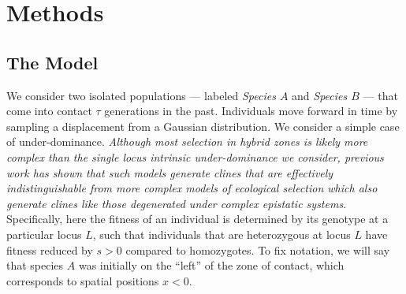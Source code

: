 \documentclass[12pt]{article}
\newcommand{\yb}[1]{{\em \color{magenta} #1}}
\begin{document}



	
\section{Methods}
\subsection*{The Model}
We consider two isolated populations --- labeled \emph{Species $A$} and \emph{Species $B$} ---  that come into contact $\tau$ generations in the past. 
Individuals move forward in time by sampling a displacement from a Gaussian distribution. 
We consider a simple case of under-dominance. 
\yb{Although most selection in hybrid zones is likely more complex than the single locus intrinsic under-dominance we consider, previous work has shown that such models generate clines that are effectively indistinguishable from more complex models of ecological selection \citep{Barton1989, Barton1993} which also generate clines like those degenerated under complex epistatic systems}. Specifically, here the fitness of an individual is  determined by its genotype at a particular locus $L$, such that individuals that are heterozygous at locus $L$ have fitness reduced by $s>0$ compared to homozygotes. To fix notation, we will say that species $A$ was initially on the ``left'' of the zone of contact, which corresponds to spatial positions $x<0$. 
\end{document}
